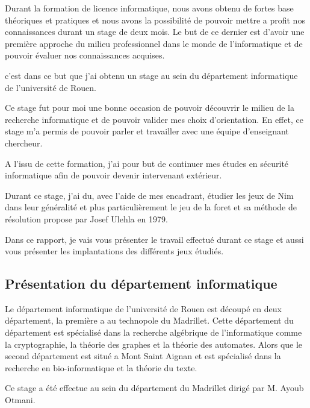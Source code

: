 Durant la formation de licence informatique, nous avons obtenu de fortes base théoriques et pratiques et nous avons la possibilité de pouvoir mettre a profit nos connaissances durant un stage de deux mois. Le but de ce dernier est d'avoir une première approche du milieu professionnel dans le monde de l'informatique et de pouvoir évaluer nos connaissances acquises.

c'est dans ce but que j'ai obtenu un stage au sein du département informatique de l’université de Rouen.

Ce stage fut pour moi une bonne occasion de pouvoir découvrir le milieu de la recherche informatique et de pouvoir valider mes choix d'orientation. En effet, ce stage m'a permis de pouvoir parler et travailler avec une équipe d'enseignant chercheur.

A l'issu de cette formation, j'ai pour but de continuer mes études en sécurité informatique afin de pouvoir devenir intervenant extérieur.

Durant ce stage, j'ai du, avec l'aide de mes encadrant, étudier les jeux de Nim dans leur généralité et plus particulièrement le jeu de la foret et sa méthode de résolution propose par Josef Ulehla en 1979.

Dans ce rapport, je vais vous présenter le travail effectué durant ce stage et aussi vous présenter les implantations des différents jeux étudiés.

\subsection{Présentation du département informatique}
\label{sub: Présentation du département informatique}

Le département informatique de l’université de Rouen est découpé en deux département, la première a au technopole du Madrillet. Cette département du département est spécialisé dans la recherche algébrique de l'informatique comme la cryptographie, la théorie des graphes et la théorie des automates. Alors que le second département est situé a Mont Saint Aignan et est spécialisé dans la recherche en bio-informatique et la théorie du texte.

Ce stage a été effectue au sein du département du Madrillet dirigé par M. Ayoub Otmani.
